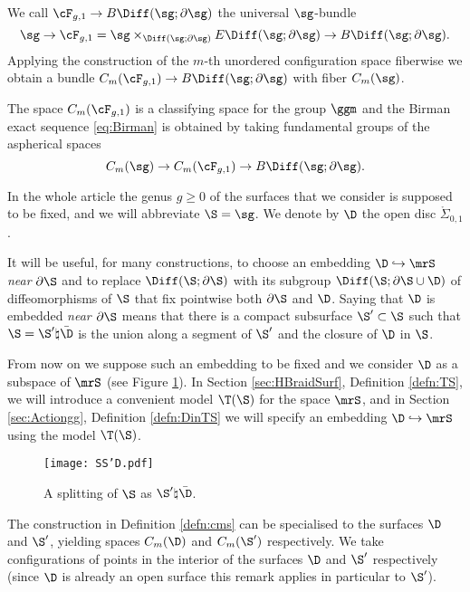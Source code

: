 We call $\cF_{g,1}\to B\Diff(\sg;\partial\sg)$ the universal
 $\sg$-bundle
 \[
  \sg\to\cF_{g,1}=\sg\times_{\Diff(\sg;\partial\sg)}E\Diff(\sg;\partial\sg)\to B\Diff(\sg;\partial\sg).
 \]
Applying the construction of the $m$-th unordered configuration space fiberwise we obtain a bundle
$C_m(\cF_{g,1})\to B\Diff(\sg;\partial\sg)$ with fiber $C_m(\sg)$.

The space $C_m(\cF_{g,1})$ is a classifying space for the
group $\ggm$ and the Birman exact sequence \eqref{eq:Birman} is obtained by taking fundamental
groups of the aspherical spaces
\begin{equation}\label{eq:Birmanbundle}
C_m(\sg)\to C_m(\cF_{g,1})\to B\Diff(\sg;\partial\sg).
\end{equation}

In the whole article the genus $g\geq 0$ of the surfaces that we consider is supposed to be fixed,
and we will abbreviate $\S=\sg$.
We denote by $\D$ the open disc $\mathring{\Sigma}_{0,1}$.

It will be useful, for many constructions, to choose an embedding
$\D\hookrightarrow\mrS$ \emph{near} $\partial\S$ and to replace
$\Diff(\S;\partial\S)$ with its subgroup $\Diff(\S;\partial\S\cup\D)$ of diffeomorphisms
of $\S$ that fix pointwise both $\partial\S$ and $\D$. Saying that $\D$ is embedded
\emph{near $\partial\S$} means that there is a compact subsurface $\S'\subset\S$
such that $\S=\S'\natural\bar\D$ is the union along a segment of $\S'$ and the closure of $\D$ in $\S$.

From now on we suppose such an embedding to be fixed and we consider $\D$ as a subspace
of $\mrS$ (see Figure \ref{fig:SS'D}). In Section \ref{sec:HBraidSurf}, Definition \ref{defn:TS},
we will introduce a convenient model $\T(\S)$ for the space $\mrS$, and in Section \ref{sec:Actiongg},
Definition \ref{defn:DinTS}
we will specify an embedding $\D\hookrightarrow\mrS$ using the model $\T(\S)$.

\begin{figure}\centering
 \texttt{[image: SS'D.pdf]}
 \caption{A splitting of $\S$ as $\S'\natural\bar\D$.}
\label{fig:SS'D}
\end{figure}

The construction in Definition \ref{defn:cms} can be specialised to the
surfaces $\D$ and $\S'$, yielding spaces $C_m(\D)$ and $C_m(\S')$ respectively.
We take configurations of points in the interior of the surfaces $\D$ and $\S'$ respectively
(since $\D$ is already an open surface this remark applies in particular to $\S'$).

